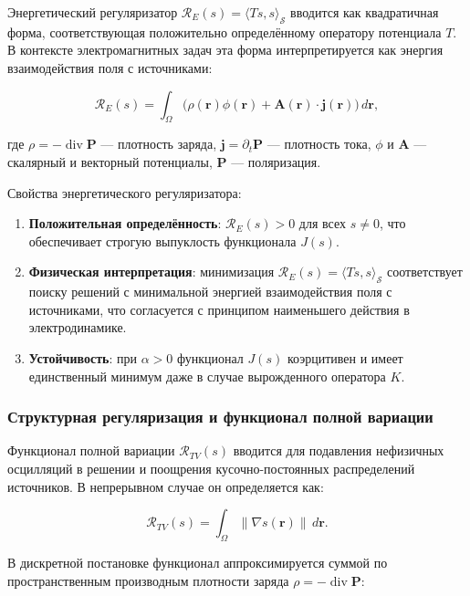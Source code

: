 \documentclass[sn-mathphys-num]{bst/sn-jnl}
\theoremstyle{thmstylethree}
\theoremstyle{thmstyletwo}
\theoremstyle{thmstyleone}
\begin{document}
Энергетический регуляризатор $\mathcal{R}_E(s) = \langle Ts, s \rangle_{\mathcal{S}}$ вводится как квадратичная форма, соответствующая положительно определённому оператору потенциала $T$. В контексте электромагнитных задач эта форма интерпретируется как энергия взаимодействия поля с источниками:

\begin{equation}
    \mathcal{R}_E(s) = \int_{\Omega} \bigl(\rho(\mathbf{r}) \phi(\mathbf{r}) + \mathbf{A}(\mathbf{r}) \cdot \mathbf{j}(\mathbf{r})\bigr) \, d\mathbf{r},
\end{equation}

где $\rho = -\operatorname{div} \mathbf{P}$ --- плотность заряда, $\mathbf{j} = \partial_t \mathbf{P}$ --- плотность тока, $\phi$ и $\mathbf{A}$ --- скалярный и векторный потенциалы, $\mathbf{P}$ --- поляризация.

Свойства энергетического регуляризатора:
\begin{enumerate}
    \item \textbf{Положительная определённость}: $\mathcal{R}_E(s) > 0$ для всех $s \neq 0$, что обеспечивает строгую выпуклость функционала $J(s)$.
    \item \textbf{Физическая интерпретация}: минимизация $\mathcal{R}_E(s) = \langle Ts, s \rangle_{\mathcal{S}}$ соответствует поиску решений с минимальной энергией взаимодействия поля с источниками, что согласуется с принципом наименьшего действия в электродинамике.
    \item \textbf{Устойчивость}: при $\alpha > 0$ функционал $J(s)$ коэрцитивен и имеет единственный минимум даже в случае вырожденного оператора $K$.
\end{enumerate}

\subsubsection{Структурная регуляризация и функционал полной вариации}

Функционал полной вариации $\mathcal{R}_{TV}(s)$ вводится для подавления нефизичных осцилляций в решении и поощрения кусочно-постоянных распределений источников. В непрерывном случае он определяется как:

\begin{equation}
    \mathcal{R}_{TV}(s) = \int_{\Omega} \|\nabla s(\mathbf{r})\| \, d\mathbf{r}.
\end{equation}

В дискретной постановке функционал аппроксимируется суммой по пространственным производным плотности заряда $\rho = -\operatorname{div} \mathbf{P}$:
\end{document}
